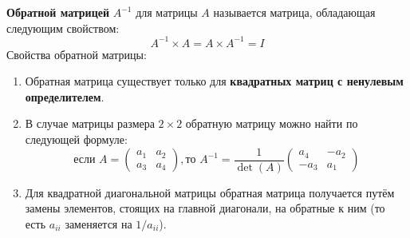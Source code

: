 \documentclass[11pt, a4paper]{extarticle}
\begin{document}
\textbf{Обратной матрицей} $A^{-1}$ для матрицы $A$ называется матрица, обладающая следующим свойством:
\[
A^{-1} \times A = A \times A^{-1} = I
\]
Свойства обратной матрицы:
\begin{enumerate}
	\item Обратная матрица существует только для \textbf{квадратных матриц с ненулевым определителем}.
	\item В случае матрицы размера $2\times2$ обратную матрицу можно найти по следующей формуле:
	\[
	\text{если }A = \begin{pmatrix}
	a_1 & a_2 \\
	a_3 & a_4
	\end{pmatrix}, \text{то } A^{-1} = \dfrac{1}{\det(A)}\begin{pmatrix}
	a_4 & -a_2 \\
	-a_3 & a_1
	\end{pmatrix}
	\]
	\item Для квадратной диагональной матрицы обратная матрица получается путём замены элементов, стоящих на главной диагонали, на обратные к ним (то есть $a_{ii}$ заменяется на $1/a_{ii}$). 
\end{enumerate}


\subsection{}
\end{document}
